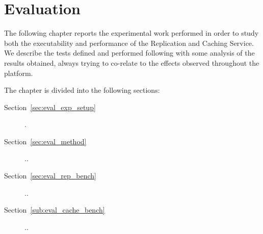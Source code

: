 \chapter{Evaluation}
\label{cha:evaluation}


The following chapter reports the experimental work performed in order to study both the executability and performance of the Replication and Caching Service. We describe the tests defined and performed following with some analysis of the results obtained, always trying to co-relate to the effects observed throughout the platform.

The chapter is divided into the following sections:

\begin{description}
    \item [Section~\ref{sec:eval_exp_setup}] .
    \item [Section~\ref{sec:eval_method}] ..
    \item [Section~\ref{sec:eval_rep_bench}] ..
    \item [Section~\ref{sub:eval_cache_bench}] ..
\end{description}





